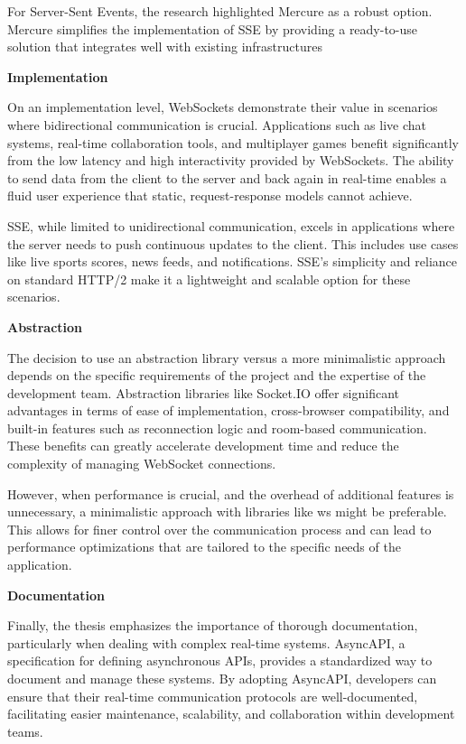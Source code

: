 For Server-Sent Events, the research highlighted Mercure as a robust option. Mercure simplifies the implementation of SSE by providing a ready-to-use solution that integrates well with existing infrastructures

\textbf{Implementation}

On an implementation level, WebSockets demonstrate their value in scenarios where bidirectional communication is crucial. Applications such as live chat systems, real-time collaboration tools, and multiplayer games benefit significantly from the low latency and high interactivity provided by WebSockets. The ability to send data from the client to the server and back again in real-time enables a fluid user experience that static, request-response models cannot achieve.

SSE, while limited to unidirectional communication, excels in applications where the server needs to push continuous updates to the client. This includes use cases like live sports scores, news feeds, and notifications. SSE's simplicity and reliance on standard HTTP/2 make it a lightweight and scalable option for these scenarios.

\textbf{Abstraction}

The decision to use an abstraction library versus a more minimalistic approach depends on the specific requirements of the project and the expertise of the development team. Abstraction libraries like Socket.IO offer significant advantages in terms of ease of implementation, cross-browser compatibility, and built-in features such as reconnection logic and room-based communication. These benefits can greatly accelerate development time and reduce the complexity of managing WebSocket connections.

However, when performance is crucial, and the overhead of additional features is unnecessary, a minimalistic approach with libraries like ws might be preferable. This allows for finer control over the communication process and can lead to performance optimizations that are tailored to the specific needs of the application.

\textbf{Documentation}

Finally, the thesis emphasizes the importance of thorough documentation, particularly when dealing with complex real-time systems. AsyncAPI, a specification for defining asynchronous APIs, provides a standardized way to document and manage these systems. By adopting AsyncAPI, developers can ensure that their real-time communication protocols are well-documented, facilitating easier maintenance, scalability, and collaboration within development teams.
